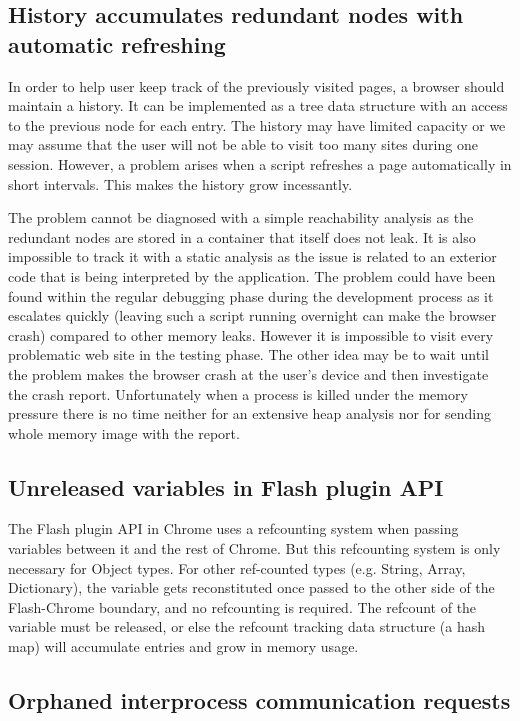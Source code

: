 \documentclass[preprint, numbers]{sigplanconf}
\begin{document}
\subsection{History accumulates redundant nodes with automatic refreshing \cite{cr-refresh}}

In order to help user keep track of the previously visited pages, a browser should maintain a history.
It can be implemented as a tree data structure with an access to the previous node for each entry.
The history may have limited capacity or
we may assume that the user will not be able
to visit too many sites during one session.
However, a problem arises when a script refreshes a page automatically in short intervals.
This makes the history grow incessantly.

The problem cannot be diagnosed with a simple reachability analysis as the redundant
nodes are stored in a container that itself does not leak.
It is also impossible to track it with a static analysis as the issue is related to an exterior
code that is being interpreted by the application.
The problem could have been found within the regular debugging phase during the development process as
it escalates quickly (leaving such a script running overnight can make the browser crash)
compared to other memory leaks.
However it is impossible to visit every problematic web site in the testing phase.
The other idea may be to wait until the problem makes the browser crash at the user's device
and then investigate the crash report.
Unfortunately when a process is killed under the memory pressure there is no time neither for an extensive
heap analysis nor for sending whole memory image with the report.

\subsection{Unreleased variables in Flash plugin API \cite{cr-flash}}
The Flash plugin API in Chrome uses a refcounting system when passing variables between it and the rest of Chrome. But this refcounting system is only necessary for Object types. For other ref-counted types (e.g. String, Array, Dictionary), the variable gets reconstituted once passed to the other side of the Flash-Chrome boundary, and no refcounting is required. The refcount of the variable must be released, or else the refcount tracking data structure (a hash map) will accumulate entries and grow in memory usage.

\subsection{Orphaned interprocess communication requests \cite{cr-orphaned}}
\end{document}
